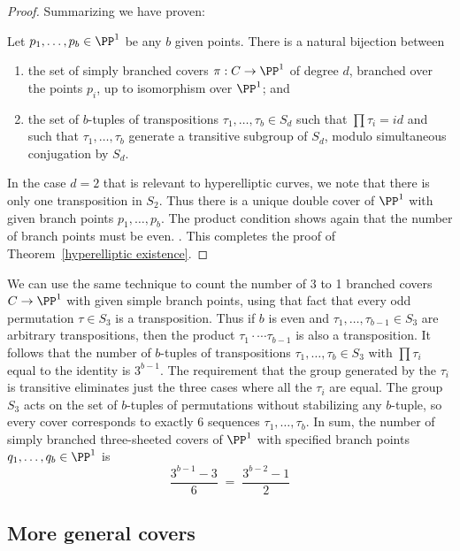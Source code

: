 \begin{proof}
Summarizing we have proven:   
   \begin{lemma}\label{branched cover classification}
   Let $p_1,\dots, p_b \in \PP^1$ be any $b$ given points. There is a natural bijection between 
   \begin{enumerate}
   \item the set of  simply branched covers $\pi : C \to \PP^1$ of degree $d$, branched over the points $p_i$, up to isomorphism over $\PP^1$; and
   \item the set of $b$-tuples of transpositions $\tau_1, \dots, \tau_b \in S_d$ such that $\prod \tau_i = id$ and such that $\tau_1, \dots, \tau_b$ generate a transitive subgroup of $S_d$, modulo simultaneous conjugation by $S_d$.
   \end{enumerate}
   \end{lemma}
In the case $d=2$ that is relevant to hyperelliptic curves, we note that there is only one transposition in $S_2$. Thus there is a unique double cover of $\PP^1$ with given branch points $p_1,\dots,p_b$. The product
condition shows again that the number of branch points must be even. . This completes the proof of Theorem~\ref{hyperelliptic existence}.
\end{proof}

We can use the same technique to count the number of 3 to 1 branched covers $C \to \PP^1$ with given simple branch points, using that fact that every odd permutation $\tau \in S_3$ is a transposition. Thus if $b$ is even and  $\tau_1,\dots,\tau_{b-1} \in S_3$ are arbitrary transpositions, then the product 
$\tau_1\cdot \cdots\tau_{b-1}$ is also a
 transposition. It follows that the number of $b$-tuples of transpositions $\tau_1,\dots,\tau_{b} \in S_3$ with $\prod \tau_i$ equal to the identity is $3^{b-1}$. The requirement that the group generated by the $\tau_i$ is transitive eliminates just the three cases where all the $\tau_i$ are equal. The group $S_3$ acts on the set of $b$-tuples of permutations without stabilizing any $b$-tuple, so every cover corresponds to exactly 6 sequences
  $\tau_1,\dots,\tau_b$. In sum, the number of simply branched three-sheeted covers of $\PP^1$ with specified branch points $q_1,\dots,q_b \in \PP^1$ is
$$
\frac{3^{b-1} - 3}{6} \; = \; \frac{3^{b-2} - 1}{2} 
$$


\subsection{More general covers}\label{general covers}

